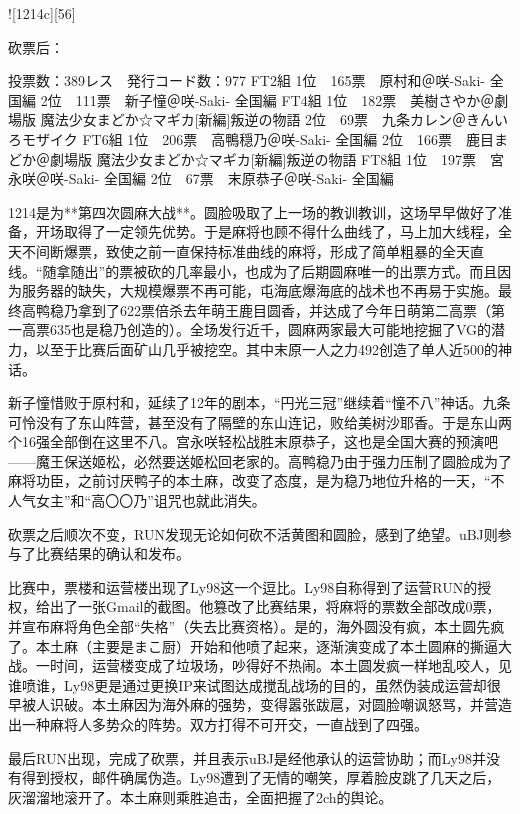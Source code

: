 ![1214c][56]

砍票后：

    投票数：389レス　発行コード数：977
    FT2組
    1位　165票　原村和＠咲-Saki- 全国編
    2位　111票　新子憧＠咲-Saki- 全国編
    FT4組
    1位　182票　美樹さやか＠劇場版 魔法少女まどか☆マギカ[新編]叛逆の物語
    2位　69票　九条カレン＠きんいろモザイク
    FT6組
    1位　206票　高鴨穏乃＠咲-Saki- 全国編
    2位　166票　鹿目まどか＠劇場版 魔法少女まどか☆マギカ[新編]叛逆の物語
    FT8組
    1位　197票　宮永咲＠咲-Saki- 全国編
    2位　67票　末原恭子＠咲-Saki- 全国編

1214是为**第四次圆麻大战**。圆脸吸取了上一场的教训教训，这场早早做好了准备，开场取得了一定领先优势。于是麻将也顾不得什么曲线了，马上加大线程，全天不间断爆票，致使之前一直保持标准曲线的麻将，形成了简单粗暴的全天直线。“随拿随出”的票被砍的几率最小，也成为了后期圆麻唯一的出票方式。而且因为服务器的缺失，大规模爆票不再可能，屯海底爆海底的战术也不再易于实施。最终高鸭稳乃拿到了622票倍杀去年萌王鹿目圆香，并达成了今年日萌第二高票（第一高票635也是稳乃创造的）。全场发行近千，圆麻两家最大可能地挖掘了VG的潜力，以至于比赛后面矿山几乎被挖空。其中末原一人之力492创造了单人近500的神话。

新子憧惜败于原村和，延续了12年的剧本，“円光三冠”继续着“憧不八”神话。九条可怜没有了东山阵营，甚至没有了隔壁的东山连记，败给美树沙耶香。于是东山两个16强全部倒在这里不八。宫永咲轻松战胜末原恭子，这也是全国大赛的预演吧——魔王保送姬松，必然要送姬松回老家的。高鸭稳乃由于强力压制了圆脸成为了麻将功臣，之前讨厌鸭子的本土麻，改变了态度，是为稳乃地位升格的一天，“不人气女主”和“高〇〇乃”诅咒也就此消失。

砍票之后顺次不变，RUN发现无论如何砍不活黄图和圆脸，感到了绝望。uBJ则参与了比赛结果的确认和发布。

比赛中，票楼和运营楼出现了Ly98这一个逗比。Ly98自称得到了运营RUN的授权，给出了一张Gmail的截图。他篡改了比赛结果，将麻将的票数全部改成0票，并宣布麻将角色全部“失格”（失去比赛资格）。是的，海外圆没有疯，本土圆先疯了。本土麻（主要是まこ厨）开始和他喷了起来，逐渐演变成了本土圆麻的撕逼大战。一时间，运营楼变成了垃圾场，吵得好不热闹。本土圆发疯一样地乱咬人，见谁喷谁，Ly98更是通过更换IP来试图达成搅乱战场的目的，虽然伪装成运营却很早被人识破。本土麻因为海外麻的强势，变得嚣张跋扈，对圆脸嘲讽怒骂，并营造出一种麻将人多势众的阵势。双方打得不可开交，一直战到了四强。

最后RUN出现，完成了砍票，并且表示uBJ是经他承认的运营协助；而Ly98并没有得到授权，邮件确属伪造。Ly98遭到了无情的嘲笑，厚着脸皮跳了几天之后，灰溜溜地滚开了。本土麻则乘胜追击，全面把握了2ch的舆论。


